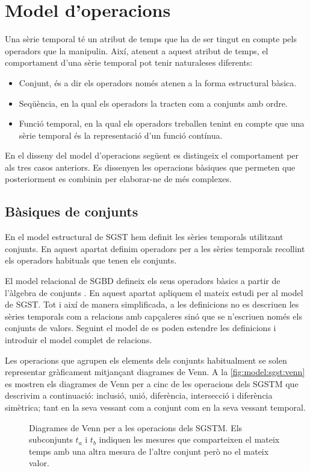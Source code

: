 \section{Model d'operacions}
\label{sec:model:sgst-operacions}

Una sèrie temporal té un atribut de temps que ha de ser tingut en
compte pels operadors que la manipulin.  Així, atenent a aquest
atribut de temps, el comportament d'una sèrie temporal pot tenir
naturaleses diferents:
\begin{itemize}
\item Conjunt, és a dir els operadors només atenen a la forma
  estructural bàsica.
\item Seqüència, en la qual els operadors la tracten com a conjunts
  amb ordre.
\item Funció temporal, en la qual els operadors treballen tenint en
  compte que una sèrie temporal és la representació d'un funció
  contínua.
\end{itemize}


En el disseny del model d'operacions següent es distingeix el
comportament per als tres casos anteriors.  Es dissenyen les
operacions bàsiques que permeten que posteriorment es combinin per
elaborar-ne de més complexes.




\subsection{Bàsiques de conjunts}

En el model estructural de SGST hem definit les sèries temporals
utilitzant conjunts. En aquest apartat definim operadors per a les
sèries temporals recollint els operadors habituals que tenen els
conjunts.

El model relacional de SGBD defineix els seus operadors bàsics a
partir de l'àlgebra de
conjunts \parencite[cap.~6]{date:introduction}. En aquest apartat
apliquem el mateix estudi per al model de SGST. Tot i així de manera
simplificada, a les definicions no es descriuen les sèries temporals
com a relacions amb capçaleres sinó que se n'escriuen només els
conjunts de valors. Seguint el model de \citeauthor{date:introduction}
es poden estendre les definicions i introduir el model complet de
relacions.


Les operacions que agrupen els elements dels conjunts habitualment se
solen representar gràficament mitjançant diagrames de Venn. A la
\autoref{fig:model:sgst:venn} es mostren els diagrames de Venn per a
cinc de les operacions dels SGSTM que descrivim a continuació:
inclusió, unió, diferència, intersecció i diferència simètrica; tant
en la seva vessant com a conjunt com en la seva vessant temporal.
\begin{figure}[tp]
  \centering
  
  \caption{Diagrames de Venn per a les operacions dels SGSTM. Els
    subconjunts $t_a$ i $t_b$ indiquen les mesures que comparteixen el
    mateix temps amb una altra mesura de l'altre conjunt però no el
    mateix valor.}
  \label{fig:model:sgst:venn}
\end{figure}


